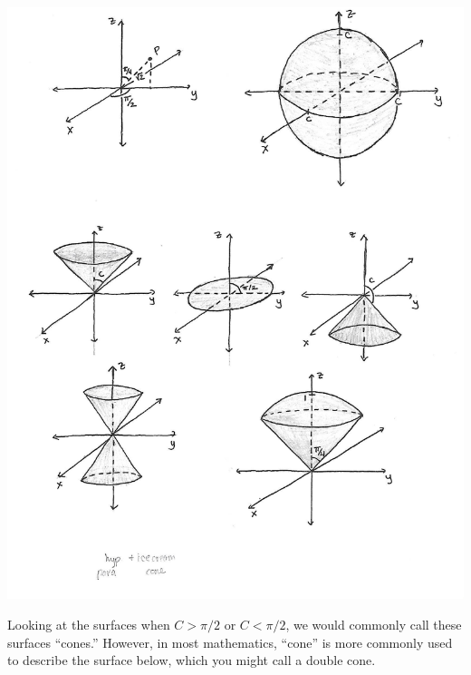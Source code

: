 \documentclass{ximera}
\begin{document}
\begin{image}
\includegraphics{phi_constant}
\end{image}

Looking at the surfaces when $C>\pi/2$ or $C<\pi/2$, we would commonly call these surfaces ``cones.'' However, in most mathematics, ``cone'' is more commonly used to describe the surface below, which you might call a double cone.
\end{document}
